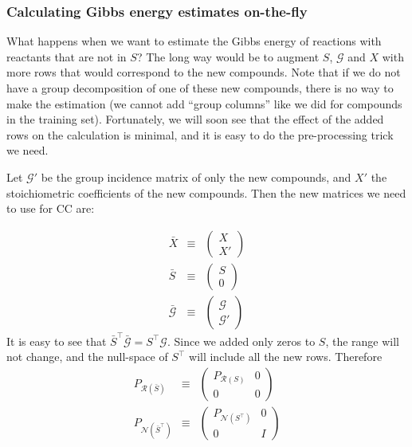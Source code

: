 \documentclass{article}
\newcommand{\Gmat}{\mathcal{G}}
\newcommand{\PRmat}[1]{P_{\mathcal{R}\left(#1\right)}}
\newcommand{\PNmat}[1]{P_{\mathcal{N}\left(#1\right)}}
\begin{document}
\subsubsection{Calculating Gibbs energy estimates on-the-fly}

What happens when we want to estimate the Gibbs energy of reactions with reactants that are not in $S$? The long way would be to augment $S$, $\Gmat$ and $X$ with more rows that would correspond to the new compounds. Note that if we do not have a group decomposition of one of these new compounds, there is no way to make the estimation (we cannot add ``group columns'' like we did for compounds in the training set). Fortunately, we will soon see that the effect of the added rows on the calculation is minimal, and it is easy to do the pre-processing trick we need.

Let $\Gmat'$ be the group incidence matrix of only the new compounds, and $X'$ the stoichiometric coefficients of the new compounds. Then the new matrices we need to use for CC are:

\begin{eqnarray}
	\bar{X} & \equiv & \left( \begin{array}{c} X \\ \hline X' \end{array} \right) \\
	\bar{S} & \equiv & \left( \begin{array}{c} S \\ \hline 0 \end{array} \right) \\
	\bar{\Gmat} & \equiv & \left( \begin{array}{c} \Gmat \\ \hline \Gmat'\end{array} \right)
\end{eqnarray}
It is easy to see that $\bar{S}^\top \bar{\Gmat} = S^\top \Gmat$. Since we added only zeros to $S$, the range will not change, and the null-space of $S^\top$ will include all the new rows. Therefore
\begin{eqnarray}
	\PRmat{\bar{S}} & \equiv & \left( \begin{array}{c|c} \PRmat{S} & 0 \\ \hline 0 & 0 \end{array} \right)	 \\
	\PNmat{\bar{S}^\top} & \equiv & \left( \begin{array}{c|c} \PNmat{S^\top} & 0 \\ \hline 0 & I \end{array} \right)
\end{eqnarray}
\end{document}
